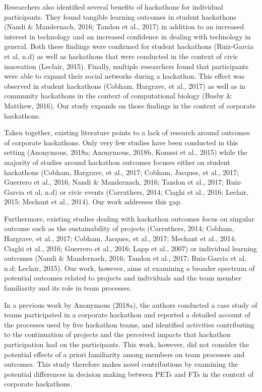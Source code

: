 \documentclass{hcij}
\begin{document}
Researchers also identified several benefits of hackathons for individual participants. They found tangible learning outcomes in student hackathons (Nandi & Mandernach, 2016; Tandon et al., 2017) in addition to an increased interest in technology and an increased confidence in dealing with technology in general. Both these findings were confirmed for student hackathons (Ruiz-Garcia et al, n.d) as well as hackathons that were conducted in the context of civic innovation (Leclair, 2015). Finally, multiple researchers found that participants were able to expand their social networks during a hackathon. This effect was observed in student hackathons (Cobham, Hargrave, et al., 2017) as well as in community hackathons in the context of computational biology (Busby & Matthew, 2016). Our study expands on those findings in the context of corporate hackathons.

Taken together, existing literature points to a lack of research around outcomes of corporate hackathons. Only very few studies have been conducted in this setting (Anonymous, 2018a; Anonymous, 2018b, Komssi et al., 2015) while the majority of studies around hackathon outcomes focuses either on student hackathons (Cobham, Hargrave, et al., 2017; Cobham, Jacques, et al., 2017; Guerrero et al., 2016; Nandi & Mandernach, 2016; Tandon et al., 2017; Ruiz-Garcia et al, n.d) or civic events (Carruthers, 2014; Ciaghi et al., 2016; Leclair, 2015; Mechant et al., 2014). Our work addresses this gap.

Furthermore, existing studies dealing with hackathon outcomes focus on singular outcome such as the sustainability of projects (Carruthers, 2014; Cobham, Hargrave, et al., 2017; Cobham, Jacques, et al., 2017; Mechant et al., 2014; Ciaghi et al., 2016; Guerrero et al., 2016; Lapp et al., 2007) or individual learning outcomes (Nandi & Mandernach, 2016; Tandon et al., 2017; Ruiz-Garcia et al, n.d; Leclair, 2015). Our work, however, aims at examining a broader spectrum of potential outcomes related to projects and individuals and the team member familiarity and its role in team processes.

In a previous work by Anonymous (2018a), the authors conducted a case study of teams participated in a corporate hackathon and reported a detailed account of the processes used by five hackathon teams, and identified activities contributing to the continuation of projects and the perceived impacts that hackathon participation had on the participants. This work, however, did not consider the potential effects of a priori familiarity among members on team processes and outcomes. This study therefore makes novel contributions by examining the potential differences in decision making between PETs and FTs in the context of corporate hackathons.
\end{document}
